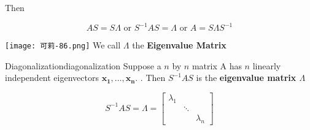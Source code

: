 Then

\begin{equation}
    AS = S\Lambda \text{\ \ \ \ \ \ or \ \ \ \ \ \ } S^{-1}AS = \Lambda \text{\ \ \ \ \ \ or \ \ \ \ \ \ } A = S\Lambda S^{-1}
\end{equation}

\texttt{[image: 可莉-86.png]} We call $\Lambda$ the \textbf{Eigenvalue Matrix}

\begin{Definition}{Diagonalization}{diagonalization}
    Suppose a $n$ by $n$ matrix A has $n$ linearly independent eigenvectors
    $\boldsymbol{x_1}, \ldots, \boldsymbol{x_n}$. . Then
    $S^{-1}AS$ is the \textbf{eigenvalue matrix $\Lambda$}

    \begin{equation}
        S^{-1}AS = \Lambda = \begin{bmatrix}
                                \lambda_1 &      & \\
                                &         \ddots & \\
                                &         &      \lambda_n
        \end{bmatrix}
    \end{equation}
\end{Definition}

